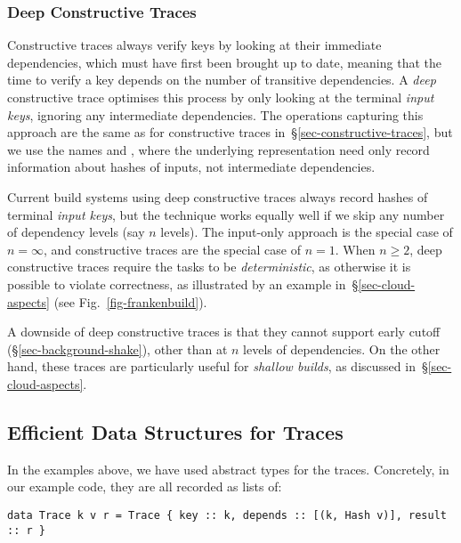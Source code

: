 \subsubsection{Deep Constructive Traces}\label{sec-deep-constructive-traces}

Constructive traces always verify keys by looking at their immediate
dependencies, which must have first been brought up to date, meaning that the
time to verify a key depends on the number of transitive dependencies. A
\emph{deep} constructive trace optimises this process by only looking at the
terminal \emph{input keys}, ignoring any intermediate dependencies. The operations
capturing this approach are the same as for constructive traces
in~\S\ref{sec-constructive-traces}, but we use the names  and
, where the underlying  representation need only record
information about hashes of inputs, not intermediate dependencies.

Current build systems using deep constructive traces always record hashes of
terminal \emph{input keys}, but the technique works equally well if we skip any
number of dependency levels (say $n$ levels). The input-only approach is the
special case of $n = \infty$, and constructive traces are the special case of
$n = 1$. When $n \ge 2$, deep constructive traces require the tasks to be
\emph{deterministic}, as otherwise it is possible to violate correctness, as
illustrated by an example in~\S\ref{sec-cloud-aspects}
(see Fig.~\ref{fig-frankenbuild}).

A downside of deep constructive traces is that they cannot support early cutoff
(\S\ref{sec-background-shake}), other than at $n$ levels of dependencies. On the
other hand, these traces are particularly useful for \emph{shallow builds}, as
discussed in~\S\ref{sec-cloud-aspects}.

\subsection{Efficient Data Structures for Traces}\label{sec-smart-traces}

In the examples above, we have used abstract types for the traces. Concretely,
in our example code, they are all recorded as lists of:

\begin{verbatim}
data Trace k v r = Trace { key :: k, depends :: [(k, Hash v)], result :: r }
\end{verbatim}

